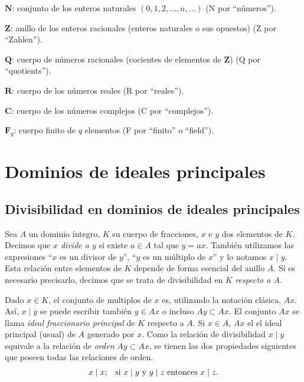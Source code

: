 \documentclass[bibtotoc,leqno,spanish]{amsbook}
\newcommand{\RR}{\mathbf{R}}
\newcommand{\QQ}{\mathbf{Q}}
\newcommand{\ZZ}{\mathbf{Z}}
\newcommand{\NN}{\mathbf{N}}
\newcommand{\FF}{\mathbf{F}}
\newcommand{\CC}{\mathbf{C}}
\numberwithin{equation}{section}
\theoremstyle{note}
\theoremstyle{note}
\theoremstyle{rem}
\numberwithin{theorem}{section}
\numberwithin{proposition}{section}
\numberwithin{definition}{section}
\numberwithin{lemma}{section}
\numberwithin{corollary}{section}
\numberwithin{example}{section}
\numberwithin{footnote}{section}%
\begin{document}
\begin{trivlist}\setlength{\itemindent}{\parindent}
\item[$\NN$:] conjunto de los enteros naturales $(0,1,2,\dots,n,\dots)$ (N por ``n\'umeros'').
\item[$\ZZ$:] anillo de los enteros racionales (enteros naturales o sus opuestos)
(Z por ``Zahlen'').
\item[$\QQ$:] cuerpo de n\'umeros racionales (cocientes de elementos de $\ZZ$) (Q por
``quotients'').
\item[$\RR$:] cuerpo de los n\'umeros reales (R por ``reales'').
\item[$\CC$:] cuerpo de los n\'umeros complejos (C por ``complejos'').
\item[$\FF_{q}$:] cuerpo finito de $q$ elementos (F por ``finito'' o ``field'').
\end{trivlist}

\mainmatter

\chapter{Dominios de ideales principales}\label{cap1}

\section{Divisibilidad en dominios de ideales principales}\label{sec1.1}

Sea $A$ un dominio \'integro, $K$ su cuerpo de fracciones, $x$ e $y$ dos elementos de $K$.
Decimos que \emph{$x$ divide a $y$} si existe $a\in A$ tal que $y = ax$. Tambi\'en utilizamos
las expresiones ``$x$ es un divisor de $y$'', ``$y$ es un m\'ultiplo de $x$'' y lo notamos $x\mid y$.
Esta relaci\'on entre elementos de $K$ depende de forma esencial del anillo $A$. Si es necesario
precisarlo, decimos que se trata de divisibilidad en $K$ \emph{respecto a $A$.}

Dado $x\in K$, el conjunto de multiplos de $x$ es, utilizando la notaci\'on cl\'asica, $Ax$. As\'i,
$x\mid y$ se puede escribir tambi\'en $y\in Ax$ o incluso $Ay\subset Ax$. El conjunto $Ax$
se llama \emph{ideal fraccionario principal} de $K$ respecto a $A$. Si $x\in A$, $Ax$ el el
ideal principal (usual) de $A$ generado por $x$. Como la relaci\'on de divisibilidad $x\mid y$
equivale a la relaci\'on de \emph{orden} $Ay\subset Ax$, se tienen las dos propiedades siguientes
que poseen todas las relaciones de orden.
\begin{gather}
\text{$x\mid x$;\quad si $x\mid y$ y $y\mid z$ entonces $x\mid z$}.
\end{gather}
\end{document}
